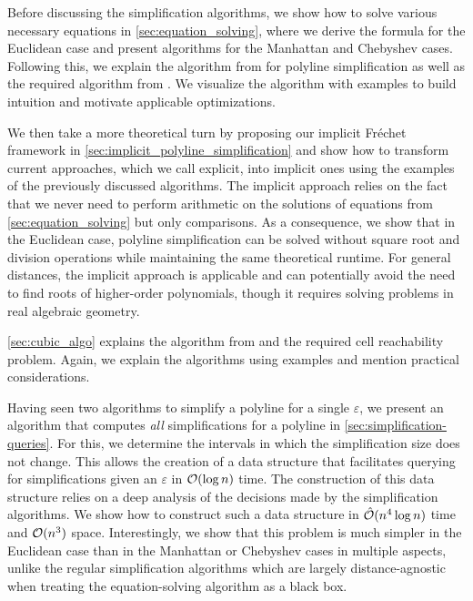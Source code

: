 Before discussing the simplification algorithms, we show how to solve various necessary equations in \cref{sec:equation_solving}, where we derive the formula for the Euclidean case and present algorithms for the Manhattan and Chebyshev cases. Following this, we explain the algorithm from \citeauthor{on_optimal_polyline_simplification_using_the_hausdorff_and_frechet_distance} for polyline simplification as well as the required algorithm from \citeauthor{computing_the_frechet_distance_between_two_polygonal_curves}. We visualize the algorithm with examples to build intuition and motivate applicable optimizations.

We then take a more theoretical turn by proposing our implicit Fréchet framework in \cref{sec:implicit_polyline_simplification} and show how to transform current approaches, which we call explicit, into implicit ones using the examples of the previously discussed algorithms. The implicit approach relies on the fact that we never need to perform arithmetic on the solutions of equations from \cref{sec:equation_solving} but only comparisons. As a consequence, we show that in the Euclidean case, polyline simplification can be solved without square root and division operations while maintaining the same theoretical runtime. For general distances, the implicit approach is applicable and can potentially avoid the need to find roots of higher-order polynomials, though it requires solving problems in real algebraic geometry.

\cref{sec:cubic_algo} explains the algorithm from \citeauthor{polyline_simplification_has_cubic_complexity_bringmannetal} and the required cell reachability problem. Again, we explain the algorithms using examples and mention practical considerations.

Having seen two algorithms to simplify a polyline for a single \(\varepsilon\), we present an algorithm that computes \emph{all} simplifications for a polyline in \cref{sec:simplification-queries}. For this, we determine the intervals in which the simplification size does not change. This allows the creation of a data structure that facilitates querying for simplifications given an \(\varepsilon\) in \(\mathcal{O}(\log n)\) time. The construction of this data structure relies on a deep analysis of the decisions made by the simplification algorithms. We show how to construct such a data structure in \(\hat{\mathcal{O}}(n^4 \log n)\) time and \(\mathcal{O}(n^3)\) space. Interestingly, we show that this problem is much simpler in the Euclidean case than in the Manhattan or Chebyshev cases in multiple aspects, unlike the regular simplification algorithms which are largely distance-agnostic when treating the equation-solving algorithm as a black box.

